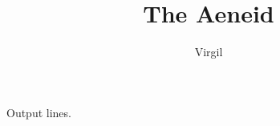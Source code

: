 \documentclass[12pt]{book}
\title{The Aeneid}
\author{Virgil}
\date{}
\newcommand\newchapter[1]{%
}
\newcounter{CurrentLine}
\begin{document}


    \begin{linenumbers}
    \begin{flushleft}
        
    \end{flushleft}
    \end{linenumbers}

    Output  lines.

    \printglossary[type=common]
    \printglossary[type=uncommon]
\end{document}
